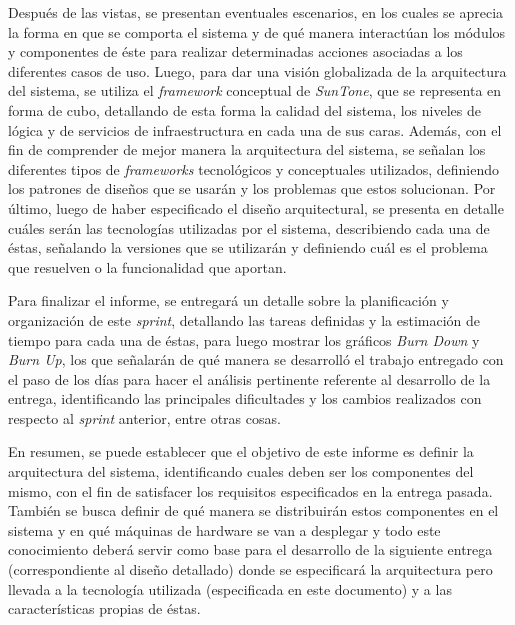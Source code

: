 \documentclass{memoria}
\begin{document}
Después de las vistas, se presentan eventuales escenarios, en los cuales se aprecia la forma en que se comporta el sistema y de qué manera interactúan los módulos y componentes de éste para realizar determinadas acciones asociadas a los diferentes casos de uso. Luego, para dar una visión globalizada de la arquitectura del sistema, se utiliza el \textsl{framework} conceptual de \textsl{SunTone}, que se representa en forma de cubo, detallando de esta forma la calidad del sistema, los niveles de lógica y de servicios de infraestructura en cada una de sus caras. Además, con el fin de comprender de mejor manera la arquitectura del sistema, se señalan los diferentes tipos de \textsl{frameworks} tecnológicos y conceptuales utilizados, definiendo los patrones de diseños que se usarán y los problemas que estos solucionan. Por último, luego de haber especificado el diseño arquitectural, se presenta en detalle cuáles serán las tecnologías utilizadas por el sistema, describiendo cada una de éstas, señalando la versiones que se utilizarán y definiendo cuál es el problema que resuelven o la funcionalidad que aportan. 

Para finalizar el informe, se entregará un detalle sobre la planificación y organización de este \textsl{sprint}, detallando las tareas definidas y la estimación de tiempo para cada una de éstas, para luego mostrar los gráficos \textsl{Burn Down} y \textsl{Burn Up}, los que señalarán de qué manera se desarrolló el trabajo entregado con el paso de los días para hacer el análisis pertinente referente al desarrollo de la entrega, identificando las principales dificultades y los cambios realizados con respecto al \textsl{sprint} anterior, entre otras cosas. 

En resumen, se puede establecer que el objetivo de este informe es definir la arquitectura del sistema, identificando cuales deben ser los componentes del mismo, con el fin de satisfacer los requisitos especificados en la entrega pasada. También se busca definir de qué manera se distribuirán estos componentes en el sistema y en qué máquinas de hardware se van a desplegar y todo este conocimiento deberá servir como base para el desarrollo de la siguiente entrega (correspondiente al diseño detallado) donde se especificará la arquitectura pero llevada a la tecnología utilizada (especificada en este documento) y a las características propias de éstas.

\end{document}

